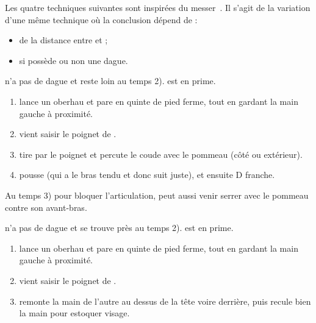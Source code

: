 Les quatre techniques suivantes sont inspirées du messer~\cite{kleinau:dijon:rapier_messer:2015}.
Il s'agit de la variation d'une même technique où la conclusion dépend de :
\begin{itemize}
	\item de la distance entre \A et \D ;
	\item si \A possède ou non une dague.
\end{itemize}


\begin{technique}

\A n'a pas de dague et reste loin au temps 2).
\D est en prime.

\begin{enumerate}
	\item \A lance un oberhau et \D pare en quinte de pied ferme, tout en gardant la main gauche à proximité.
	
	\item \D vient saisir le poignet de \A.
	
	\item \D tire par le poignet et percute le coude avec le pommeau (côté ou extérieur).
	
	\item \D pousse \A (qui a le bras tendu et donc suit juste), et ensuite D franche.
\end{enumerate}

Au temps 3) pour bloquer l'articulation, \D peut aussi venir serrer avec le pommeau contre son avant-bras.

\end{technique}


\begin{technique}

\A n'a pas de dague et se trouve près au temps 2).
\D est en prime.

\begin{enumerate}
	\item \A lance un oberhau et \D pare en quinte de pied ferme, tout en gardant la main gauche à proximité.
	
	\item \D vient saisir le poignet de \A.
	
	\item \D remonte la main de l'autre au dessus de la tête voire derrière, puis recule bien la main pour estoquer visage.
\end{enumerate}

\end{technique}


